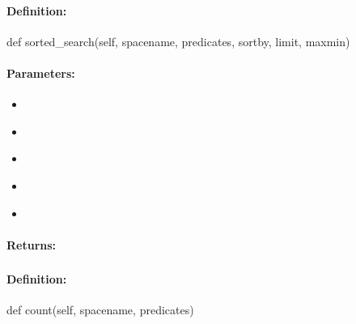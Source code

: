\paragraph{Definition:}
\begin{pythoncode}
def sorted_search(self, spacename, predicates, sortby, limit, maxmin)
\end{pythoncode}

\paragraph{Parameters:}
\begin{itemize}[noitemsep]
\item {}\\

\item {}\\

\item {}\\

\item {}\\

\item {}\\

\end{itemize}

\paragraph{Returns:}


\pagebreak
\subsubsection{}
\label{api:python:count}


\paragraph{Definition:}
\begin{pythoncode}
def count(self, spacename, predicates)
\end{pythoncode}

